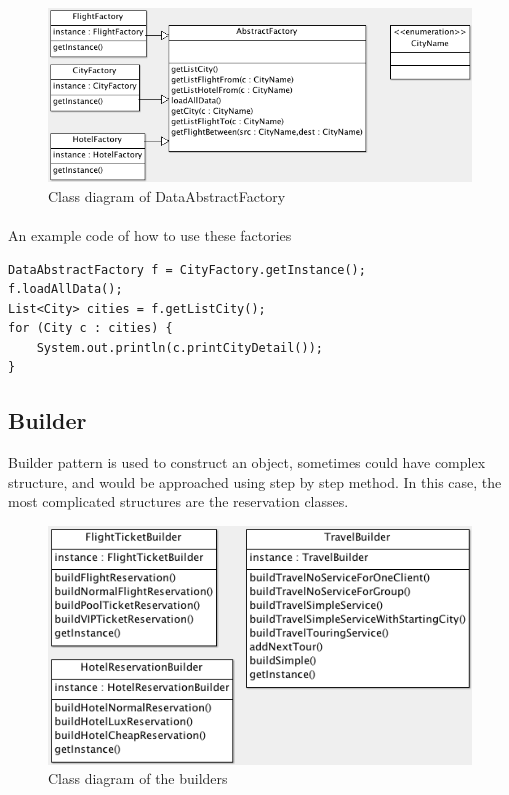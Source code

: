 \begin{figure}[h]
\centering
\includegraphics[width=12cm]{project/images/factory.png}
\caption{Class diagram of DataAbstractFactory}
\end{figure}

\paragraph{}
An example code of how to use these factories
\begin{lstlisting}
DataAbstractFactory f = CityFactory.getInstance();
f.loadAllData();
List<City> cities = f.getListCity();
for (City c : cities) {
	System.out.println(c.printCityDetail());
}
\end{lstlisting}

\newpage
\subsection{Builder}
Builder pattern is used to construct an object, sometimes could have complex structure, and would be approached using step by step method. In this case, the most complicated structures are the reservation classes. 

\begin{figure}[h]
\centering
\includegraphics[width=12cm]{project/images/builder.png}
\caption{Class diagram of the builders}
\end{figure}

